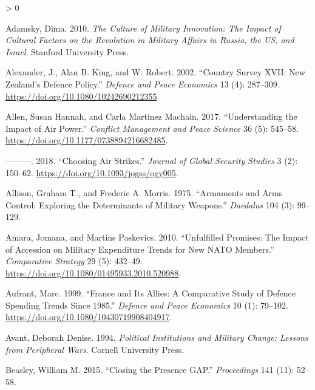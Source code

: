 \documentclass[
]{article}
\newlength{\cslhangindent}
\newenvironment{CSLReferences}[2] %
 {%
  \setlength{\parindent}{0pt}
  \ifodd #1 \everypar{\setlength{\hangindent}{\cslhangindent}}\ignorespaces\fi
  \ifnum #2 > 0
  \setlength{\parskip}{#2\baselineskip}
  \fi
 }%
 {}
\begin{document}
\hypertarget{refs}{}
\begin{CSLReferences}{1}{0}
\leavevmode\hypertarget{ref-adamsky_culturemilitaryinnovation_2010}{}%
Adamsky, Dima. 2010. \emph{The {Culture} of {Military Innovation}: {The Impact} of {Cultural Factors} on the {Revolution} in {Military Affairs} in {Russia}, the {US}, and {Israel}}. {Stanford University Press}.

\leavevmode\hypertarget{ref-alexander_countrysurveyxvii_2002}{}%
Alexander, J., Alan B. King, and W. Robert. 2002. {``Country Survey {XVII}: {New} Zealand's Defence Policy.''} \emph{Defence and Peace Economics} 13 (4): 287--309. \url{https://doi.org/10.1080/10242690212355}.

\leavevmode\hypertarget{ref-allen_understandingimpactair_2017}{}%
Allen, Susan Hannah, and Carla Martinez Machain. 2017. {``Understanding the Impact of Air Power.''} \emph{Conflict Management and Peace Science} 36 (5): 545--58. \url{https://doi.org/10.1177/0738894216682485}.

\leavevmode\hypertarget{ref-allen_choosingairstrikes_2018}{}%
---------. 2018. {``Choosing {Air Strikes}.''} \emph{Journal of Global Security Studies} 3 (2): 150--62. \url{https://doi.org/10.1093/jogss/ogy005}.

\leavevmode\hypertarget{ref-allison_armamentsarmscontrol_1975}{}%
Allison, Graham T., and Frederic A. Morris. 1975. {``Armaments and {Arms Control}: {Exploring} the {Determinants} of {Military Weapons}.''} \emph{Daedalus} 104 (3): 99--129.

\leavevmode\hypertarget{ref-amara_unfulfilledpromisesimpact_2010}{}%
Amara, Jomana, and Martins Paskevics. 2010. {``Unfulfilled {Promises}: {The Impact} of {Accession} on {Military Expenditure Trends} for {New NATO Members}.''} \emph{Comparative Strategy} 29 (5): 432--49. \url{https://doi.org/10.1080/01495933.2010.520988}.

\leavevmode\hypertarget{ref-aufrant_franceitsallies_1999}{}%
Aufrant, Marc. 1999. {``France and Its Allies: {A} Comparative Study of Defence Spending Trends Since 1985.''} \emph{Defence and Peace Economics} 10 (1): 79--102. \url{https://doi.org/10.1080/10430719908404917}.

\leavevmode\hypertarget{ref-avant_politicalinstitutionsmilitary_1994}{}%
Avant, Deborah Denise. 1994. \emph{Political {Institutions} and {Military Change}: {Lessons} from {Peripheral Wars}}. {Cornell University Press}.

\leavevmode\hypertarget{ref-beasley_closingpresencegap_2015}{}%
Beasley, William M. 2015. {``Closing the {Presence GAP}.''} \emph{Proceedings} 141 (11): 52--58.


\end{CSLReferences}
\end{document}
